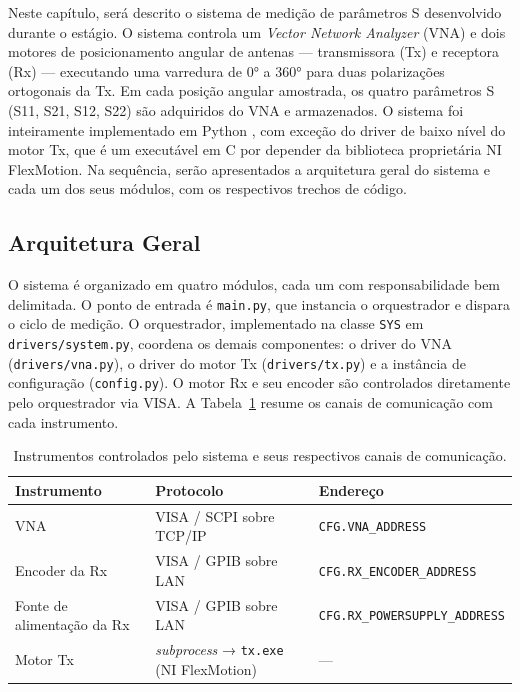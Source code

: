 \documentclass[12pt, a4paper]{article}
\begin{document}
Neste capítulo, será descrito o sistema de medição de parâmetros S desenvolvido durante o estágio. O sistema controla um \textit{Vector Network Analyzer} (VNA) e dois motores de posicionamento angular de antenas --- transmissora (Tx) e receptora (Rx) --- executando uma varredura de 0° a 360° para duas polarizações ortogonais da Tx. Em cada posição angular amostrada, os quatro parâmetros S (S11, S21, S12, S22) são adquiridos do VNA e armazenados. O sistema foi inteiramente implementado em Python \citep{pyvisa, numpy2020}, com exceção do driver de baixo nível do motor Tx, que é um executável em C por depender da biblioteca proprietária NI FlexMotion. Na sequência, serão apresentados a arquitetura geral do sistema e cada um dos seus módulos, com os respectivos trechos de código.

\subsection{Arquitetura Geral}

O sistema é organizado em quatro módulos, cada um com responsabilidade bem delimitada. O ponto de entrada é \texttt{main.py}, que instancia o orquestrador e dispara o ciclo de medição. O orquestrador, implementado na classe \texttt{SYS} em \texttt{drivers/system.py}, coordena os demais componentes: o driver do VNA (\texttt{drivers/vna.py}), o driver do motor Tx (\texttt{drivers/tx.py}) e a instância de configuração (\texttt{config.py}). O motor Rx e seu encoder são controlados diretamente pelo orquestrador via VISA. A Tabela~\ref{tab:hw} resume os canais de comunicação com cada instrumento.

\begin{table}[h]
\centering
\begin{tabular}{lll}
\toprule
\textbf{Instrumento}     & \textbf{Protocolo}              & \textbf{Endereço}              \\
\midrule
VNA                      & VISA / SCPI sobre TCP/IP        & \texttt{CFG.VNA\_ADDRESS}      \\
Encoder da Rx            & VISA / GPIB sobre LAN           & \texttt{CFG.RX\_ENCODER\_ADDRESS} \\
Fonte de alimentação da Rx & VISA / GPIB sobre LAN         & \texttt{CFG.RX\_POWERSUPPLY\_ADDRESS} \\
Motor Tx                 & \textit{subprocess} → \texttt{tx.exe} (NI FlexMotion) & --- \\
\bottomrule
\end{tabular}
\caption{Instrumentos controlados pelo sistema e seus respectivos canais de comunicação.}
\label{tab:hw}
\end{table}
\end{document}
